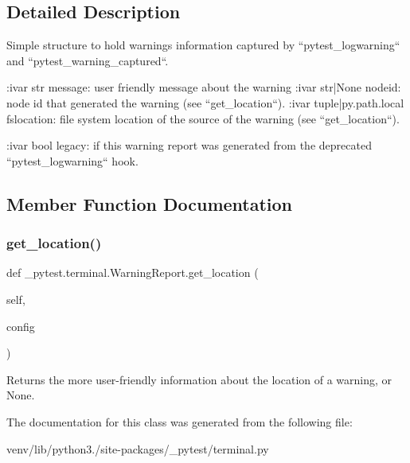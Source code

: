 \subsection{Detailed Description}
\begin{DoxyVerb}Simple structure to hold warnings information captured by ``pytest_logwarning`` and ``pytest_warning_captured``.

:ivar str message: user friendly message about the warning
:ivar str|None nodeid: node id that generated the warning (see ``get_location``).
:ivar tuple|py.path.local fslocation:
    file system location of the source of the warning (see ``get_location``).

:ivar bool legacy: if this warning report was generated from the deprecated ``pytest_logwarning`` hook.
\end{DoxyVerb}
 

\subsection{Member Function Documentation}
\mbox{\label{class__pytest_1_1terminal_1_1_warning_report_a8ae5226649cc0aef231e6e61602a440c}} 
\subsubsection{\texorpdfstring{get\+\_\+location()}{get\_location()}}
{\footnotesize\ttfamily def \+\_\+pytest.\+terminal.\+Warning\+Report.\+get\+\_\+location (\begin{DoxyParamCaption}\item[{}]{self,  }\item[{}]{config }\end{DoxyParamCaption})}

\begin{DoxyVerb}Returns the more user-friendly information about the location
of a warning, or None.
\end{DoxyVerb}
 

The documentation for this class was generated from the following file\+:\begin{DoxyCompactItemize}
\item 
venv/lib/python3./site-\/packages/\+\_\+pytest/terminal.\+py\end{DoxyCompactItemize}
